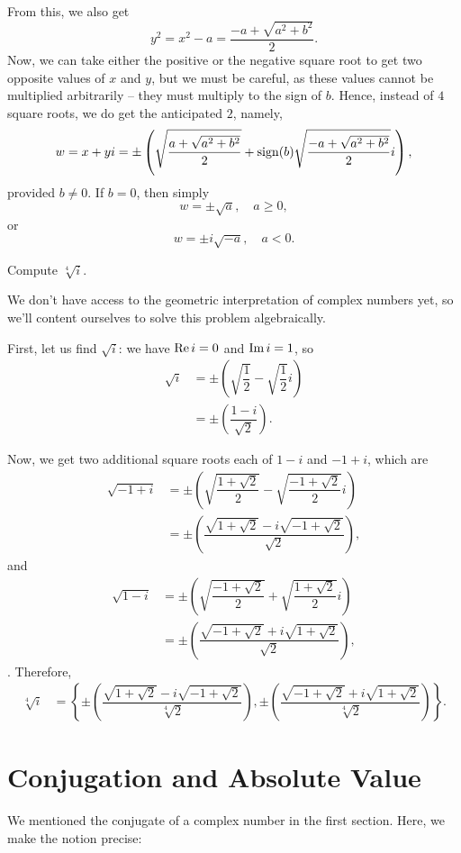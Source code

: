 From this, we also get $$y^2=x^2-a=\dfrac{-a+\sqrt{a^2+b^2}}{2}.$$ Now, we can take either the positive or the negative square root to get two opposite values of $x$ and $y$, but we must be careful, as these values cannot be multiplied arbitrarily -- they must multiply to the sign of $b$. Hence, instead of $4$ square roots, we do get the anticipated $2$, namely, $$w=x+yi=\pm \left(\sqrt{\dfrac{a+\sqrt{a^2+b^2}}{2}}+\operatorname{sign}(b)\sqrt{\dfrac{-a+\sqrt{a^2+b^2}}{2}}i\right),$$ provided $b \neq 0$. If $b=0$, then simply $$w=\pm \sqrt{a}, \quad a \ge 0,$$ or $$w=\pm i\sqrt{-a}, \quad a<0.$$

\begin{exercise}
	Compute $\sqrt[4]{i}$.
	
	\begin{sol}
		We don't have access to the geometric interpretation of complex numbers yet, so we'll content ourselves to solve this problem algebraically.
		
		First, let us find $\sqrt{i}$: we have $\operatorname{Re} i=0$ and $\operatorname{Im} i=1$, so
		\begin{align*}
			\sqrt{i} &=\pm\left(\sqrt{\dfrac{1}{2}}-\sqrt{\dfrac{1}{2}}i\right) \\
			&=\pm\left(\dfrac{1-i}{\sqrt{2}}\right).
		\end{align*}
		
		Now, we get two additional square roots each of $1-i$ and $-1+i$, which are
		\begin{align*}
			\sqrt{-1+i} &=\pm\left(\sqrt{\dfrac{1+\sqrt{2}}{2}}-\sqrt{\dfrac{-1+\sqrt{2}}{2}}i\right) \\
			&=\pm\left(\dfrac{\sqrt{1+\sqrt{2}}-i\sqrt{-1+\sqrt{2}}}{\sqrt{2}}\right),
		\end{align*}
		and
		\begin{align*}
			\sqrt{1-i} &=\pm\left(\sqrt{\dfrac{-1+\sqrt{2}}{2}}+\sqrt{\dfrac{1+\sqrt{2}}{2}}i\right) \\
			&=\pm\left(\dfrac{\sqrt{-1+\sqrt{2}}+i\sqrt{1+\sqrt{2}}}{\sqrt{2}}\right),
		\end{align*}.
		Therefore,
		\begin{align*}
			\sqrt[4]{i} &=\boxed{\left\{\pm\left(\dfrac{\sqrt{1+\sqrt{2}}-i\sqrt{-1+\sqrt{2}}}{\sqrt[4]{2}}\right), \pm\left(\dfrac{\sqrt{-1+\sqrt{2}}+i\sqrt{1+\sqrt{2}}}{\sqrt[4]{2}}\right)\right\}}.
		\end{align*}
	\end{sol}
\end{exercise}

\section{Conjugation and Absolute Value}
We mentioned the conjugate of a complex number in the first section. Here, we make the notion precise:

